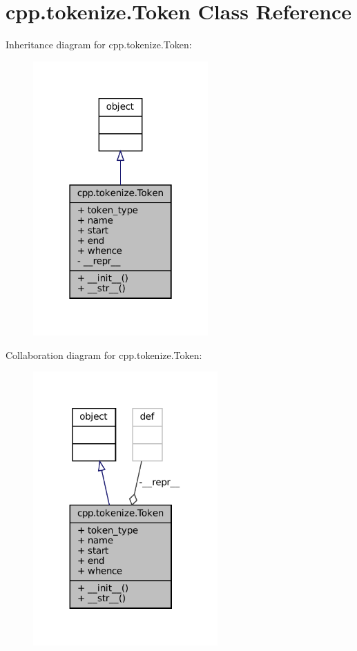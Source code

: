 \hypertarget{classcpp_1_1tokenize_1_1Token}{}\section{cpp.\+tokenize.\+Token Class Reference}
\label{classcpp_1_1tokenize_1_1Token}


Inheritance diagram for cpp.\+tokenize.\+Token\+:
\nopagebreak
\begin{figure}[H]
\begin{center}
\leavevmode
\includegraphics[width=190pt]{classcpp_1_1tokenize_1_1Token__inherit__graph}
\end{center}
\end{figure}


Collaboration diagram for cpp.\+tokenize.\+Token\+:
\nopagebreak
\begin{figure}[H]
\begin{center}
\leavevmode
\includegraphics[width=200pt]{classcpp_1_1tokenize_1_1Token__coll__graph}
\end{center}
\end{figure}
